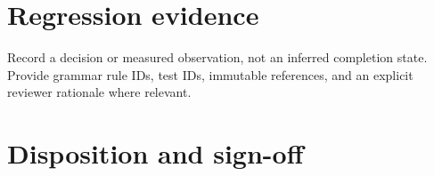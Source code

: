 \documentclass[11pt,letterpaper]{article}
\begin{document}
\section{Regression evidence}
Record a decision or measured observation, not an inferred completion state. Provide grammar rule IDs, test IDs, immutable references, and an explicit reviewer rationale where relevant.
\section{Disposition and sign-off}
\end{document}
